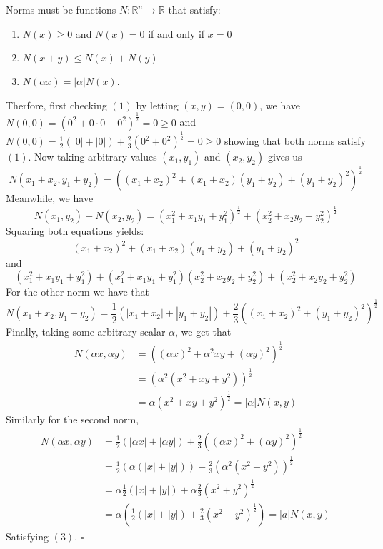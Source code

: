 \documentclass[11pt]{article}
\newcommand{\R}{\mathbb{R}}
\newenvironment{proof}{\noindent{\bf Proof.}}{\hfill $\square$\medskip}
\begin{document}
\begin{proof}
Norms must be functions $N:\R^{n}\to\R$ that satisfy:
\begin{enumerate}[label=(\arabic*)]
    \item $N(x)\geq 0$ and $N(x)=0$ if and only if $x=0$
    \item $N(x+y)\leq N(x)+N(y)$
    \item $N(\alpha x)=\lvert\alpha\rvert N(x)$.
\end{enumerate} 
Therfore, first checking $(1)$ by letting $(x,y)=(0,0)$, we have $N(0,0)=(0^{2}+0\cdot 0+0^{2})^{\frac{1}{2}}=0\geq0$ and
$N(0,0)=\frac{1}{2}(\lvert0\rvert+\lvert0\rvert)+\frac{2}{3}(0^{2}+0^{2})^{\frac{1}{2}}=0\geq0$ showing that both norms
satisfy $(1)$. Now taking arbitrary values $(x_{1},y_{1})$ and $(x_{2},y_{2})$ gives us 
$$N(x_{1}+x_{2},y_{1}+y_{2})=\left((x_{1}+x_{2})^{2}+(x_{1}+x_{2})(y_{1}+y_{2})+(y_{1}+y_{2})^{2}\right)^{\frac{1}{2}}$$
Meanwhile, we have
$$N(x_{1},y_{2})+N(x_{2},y_{2})=(x_{1}^{2}+x_{1}y_{1}+y_{1}^{2})^{\frac{1}{2}}+(x_{2}^{2}+x_{2}y_{2}+y_{2}^{2})^{\frac{1}{2}}$$
Squaring both equations yields:
$$(x_{1}+x_{2})^{2}+(x_{1}+x_{2})(y_{1}+y_{2})+(y_{1}+y_{2})^{2}$$
and
$$(x_{1}^{2}+x_{1}y_{1}+y_{1}^{2})+(x_{1}^{2}+x_{1}y_{1}+y_{1}^{2})(x_{2}^{2}+x_{2}y_{2}+y_{2}^{2})+(x_{2}^{2}+x_{2}y_{2}+y_{2}^{2})$$
For the other norm we have that
$$N(x_{1}+x_{2},y_{1}+y_{2})=\frac{1}{2}(|x_{1}+x_{2}|+|y_{1}+y_{2}|)+\frac{2}{3}((x_{1}+x_{2})^{2}+(y_{1}+y_{2})^{2})^{\frac{1}{2}}$$
Finally, taking some arbitrary scalar $\alpha$, we get that
\begin{equation}
    \begin{split}
        N(\alpha x,\alpha y)&=\left((\alpha x)^{2}+\alpha^{2}xy+(\alpha y)^{2}\right)^{\frac{1}{2}}\\
        &=\left(\alpha^{2}(x^{2}+xy+y^{2})\right)^{\frac{1}{2}}\\
        &=\alpha\left(x^{2}+xy+y^{2}\right)^{\frac{1}{2}}=\lvert\alpha\rvert N(x,y)
    \end{split}
\end{equation}
Similarly for the second norm,
\begin{equation}
    \begin{split}
        N(\alpha x,\alpha y)&=\frac{1}{2}(|\alpha x|+|\alpha y|)+\frac{2}{3}((\alpha x)^{2}+(\alpha y)^{2})^{\frac{1}{2}}\\
        &=\frac{1}{2}(\alpha(|x|+|y|))+\frac{2}{3}(\alpha^{2}(x^{2}+y^{2}))^{\frac{1}{2}}\\
        &=\alpha\frac{1}{2}(|x|+|y|)+\alpha\frac{2}{3}(x^{2}+y^{2})^{\frac{1}{2}}\\
        &=\alpha\left(\frac{1}{2}(|x|+|y|)+\frac{2}{3}(x^{2}+y^{2})^{\frac{1}{2}}\right)=|a|N(x,y)
    \end{split}
\end{equation}
Satisfying $(3)$.
\end{proof}
\end{document}
